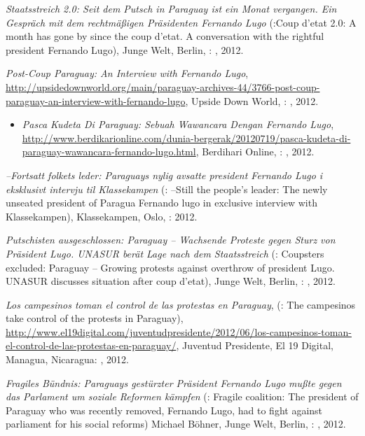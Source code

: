 \begin{itemize}
{\item \textit{Staatsstreich 2.0: Seit dem Putsch in Paraguay ist ein Monat vergangen. Ein Gespräch mit dem rechtmäßigen Präsidenten Fernando Lugo} (\english:Coup d'etat 2.0: A month has gone by since the coup d'etat. A conversation with the rightful president Fernando Lugo), Junge Welt, Berlin, \Germany: , 2012.
\item \textit{Post-Coup Paraguay: An Interview with Fernando Lugo}, \href{http://upsidedownworld.org/main/paraguay-archives-44/3766-post-coup-paraguay-an-interview-with-fernando-lugo}{http://upsidedownworld.org/main/paraguay-archives-44/3766-post-coup-paraguay-an-interview-with-fernando-lugo}, Upside Down World, \USA: , 2012.
    \begin{itemize}
    \item \translatedversion \malay \textit{Pasca Kudeta Di Paraguay: Sebuah Wawancara Dengan Fernando Lugo}, \href{http://www.berdikarionline.com/dunia-bergerak/20120719/pasca-kudeta-di-paraguay-wawancara-fernando-lugo.html}{http://www.berdikarionline.com/dunia-bergerak/20120719/pasca-kudeta-di-paraguay-wawancara-fernando-lugo.html}, Berdihari Online, \Indonesia: , 2012.
    \end{itemize}
\item \textit{--Fortsatt folkets leder: Paraguays nylig avsatte president Fernando Lugo i eksklusivt intervju til Klassekampen} (\english: --Still the people's leader: The newly unseated president of Paragua Fernando lugo in exclusive interview with Klassekampen), Klassekampen, Oslo, \Norway:  2012.
\item \textit{Putschisten ausgeschlossen: Paraguay -- Wachsende Proteste gegen Sturz von Präsident Lugo. UNASUR berät Lage nach dem Staatsstreich} (\english: Coupsters excluded: Paraguay -- Growing protests against overthrow of president Lugo. UNASUR discusses situation after coup d'etat), Junge Welt, Berlin, \Germany: , 2012.
\item \textit{Los campesinos toman el control de las protestas en Paraguay}, (\english: The campesinos take control of the protests in Paraguay), \href{http://www.el19digital.com/juventudpresidente/2012/06/los-campesinos-toman-el-control-de-las-protestas-en-paraguay/}{http://www.el19digital.com/juventudpresidente/2012/06/los-campesinos-toman-el-control-de-las-protestas-en-paraguay/}, Juventud Presidente, El 19 Digital, Managua, Nicaragua: , 2012.
\item \textit{Fragiles Bündnis: Paraguays gestürzter Präsident Fernando Lugo mußte gegen das Parlament um soziale Reformen kämpfen} (\english: Fragile coalition: The president of Paraguay who was recently removed, Fernando Lugo, had to fight against parliament for his social reforms) \with Michael Böhner, Junge Welt, Berlin, \Germany: , 2012.
}
\end{itemize}
